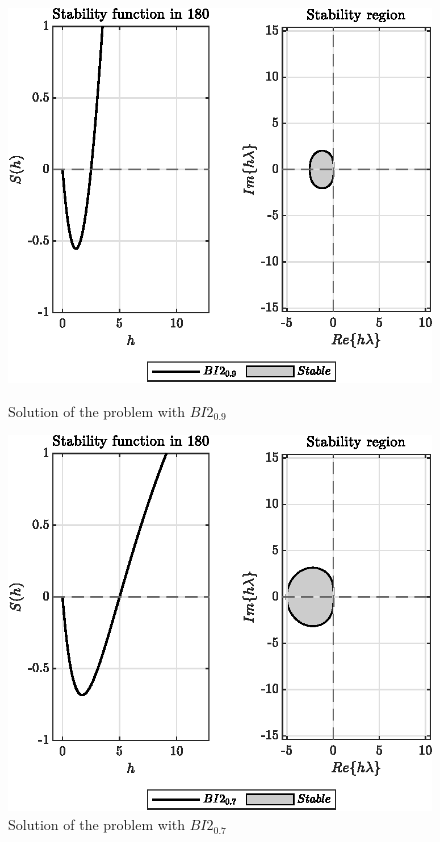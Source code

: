\documentclass[11pt,a4paper,oneside]{article}
\begin{document}
\begin{figure}[htb]
    \centering
    \begin{minipage}{0.45\textwidth}
        \centering
        \includegraphics*[width=\textwidth, keepaspectratio]{ex5_BI2_0.9.eps}
        \caption[]{\label{fig:ex5_BI2-09} Solution of the problem with $BI2_{0.9}$}
    \end{minipage}
    \hspace{0.05\textwidth}
    \begin{minipage}{0.45\textwidth}
        \centering
        \includegraphics*[width=\textwidth, keepaspectratio]{ex5_BI2_0.7.eps}
        \caption[]{\label{fig:ex5_BI2-07} Solution of the problem with $BI2_{0.7}$}
    \end{minipage}
\end{figure}
\end{document}

